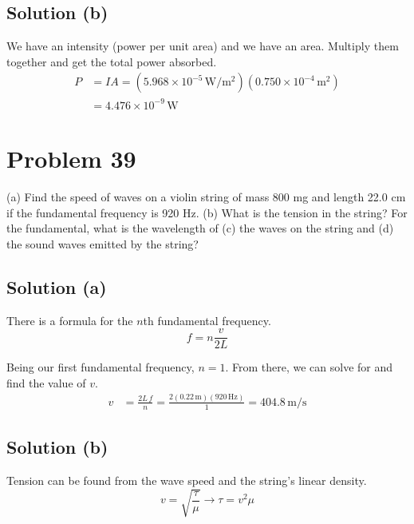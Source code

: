 \documentclass[12pt]{article}
\newcommand{\E}[1]{\times 10^{#1}}
\begin{document}
        \subsection{Solution (b)}
            We have an intensity (power per unit area) and we have an area.
            Multiply them together and get the total power absorbed.
            \begin{align}
                P   &=  IA
                    =   \left( 5.968\E{-5}\,\unit{\watt/\meter^2} \right) (0.750\E{-4}\,\unit{\meter^2})\\
                    &=  \boxed{4.476\E{-9}\,\unit{\watt}}
            \end{align}

    \pagebreak
    \section{Problem 39}
        (a) Find the speed of waves on a violin string of mass 800 mg and length 22.0 cm if the fundamental frequency is 920 Hz. 
        (b) What is the tension in the string? 
        For the fundamental, what is the wavelength of (c) the waves on the string and (d) the sound waves emitted by the string?


        \subsection{Solution (a)}
            There is a formula for the $n$th fundamental frequency.
            \begin{equation}
                f   =   n\frac{v}{2L}
            \end{equation}

            Being our first fundamental frequency, $n = 1$.
            From there, we can solve for and find the value of $v$.
            \begin{align}
                v   &=  \frac{2L\,f}{n}
                    =   \frac{2 (0.22\,\unit{\meter}) (920\,\unit{\hertz})}{1}
                    =   \boxed{404.8\,\unit{\meter/\second}}
            \end{align}

        \subsection{Solution (b)}
            Tension can be found from the wave speed and the string's linear density.
            \begin{equation}
                v   =   \sqrt{\frac{\tau}{\mu}} \to
                \tau    =   v^2 \mu
            \end{equation}
\end{document}
